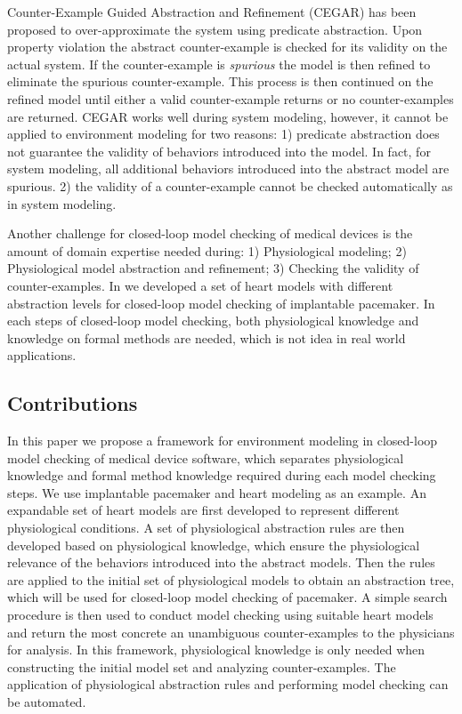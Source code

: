 Counter-Example Guided Abstraction and Refinement (CEGAR) \cite{CEGAR} has been proposed to over-approximate the system using predicate abstraction. Upon property violation the abstract counter-example is checked for its validity on the actual system. If the counter-example is \emph{spurious} the model is then refined to eliminate the spurious counter-example. This process is then continued on the refined model until either a valid counter-example returns or no counter-examples are returned. CEGAR works well during system modeling, however, it cannot be applied to environment modeling for two reasons: 1) predicate abstraction does not guarantee the validity of behaviors introduced into the model. In fact, for system modeling, all additional behaviors introduced into the abstract model are spurious. 2) the validity of a counter-example cannot be checked automatically as in system modeling.

Another challenge for closed-loop model checking of medical devices is the amount of domain expertise needed during: 1) Physiological modeling; 2) Physiological model abstraction and refinement; 3) Checking the validity of counter-examples. In \cite{sttt13} we developed a set of heart models with different abstraction levels for closed-loop model checking of implantable pacemaker. In each steps of closed-loop model checking, both physiological knowledge and knowledge on formal methods are needed, which is not idea in real world applications. %

\subsection{Contributions}
In this paper we propose a framework for environment modeling in closed-loop model checking of medical device software, which separates physiological knowledge and formal method knowledge required during each model checking steps. We use implantable pacemaker and heart modeling as an example. An expandable set of heart models are first developed to represent different physiological conditions. A set of physiological abstraction rules are then developed based on physiological knowledge, which ensure the physiological relevance of the behaviors introduced into the abstract models. Then the rules are applied to the initial set of physiological models to obtain an abstraction tree, which will be used for closed-loop model checking of pacemaker. A simple search procedure is then used to conduct model checking using suitable heart models and return the most concrete an unambiguous counter-examples to the physicians for analysis. In this framework, physiological knowledge is only needed when constructing the initial model set and analyzing counter-examples. The application of physiological abstraction rules and performing model checking can be automated.

